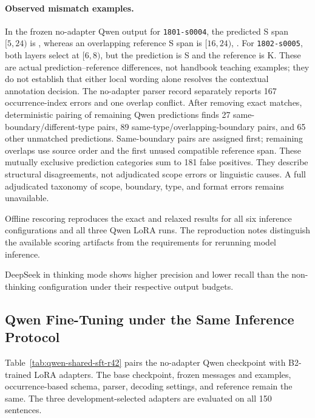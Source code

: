 \paragraph{Observed mismatch examples.}
In the frozen no-adapter Qwen output for \texttt{1801-s0004}, the predicted S span $[5,24)$ is , whereas an overlapping reference S span is $[16,24)$, . For \texttt{1802-s0005}, both layers select  at $[6,8)$, but the prediction is S and the reference is K. These are actual prediction--reference differences, not handbook teaching examples; they do not establish that either local wording alone resolves the contextual annotation decision. The no-adapter parser record separately reports 167 occurrence-index errors and one overlap conflict. After removing exact matches, deterministic pairing of remaining Qwen predictions finds 27 same-boundary/different-type pairs, 89 same-type/overlapping-boundary pairs, and 65 other unmatched predictions. Same-boundary pairs are assigned first; remaining overlaps use source order and the first unused compatible reference span. These mutually exclusive prediction categories sum to 181 false positives. They describe structural disagreements, not adjudicated scope errors or linguistic causes. A full adjudicated taxonomy of scope, boundary, type, and format errors remains unavailable.

\FloatBarrier
Offline rescoring reproduces the exact and relaxed results for all six inference configurations and all three Qwen LoRA runs. The reproduction notes distinguish the available scoring artifacts from the requirements for rerunning model inference.

DeepSeek in thinking mode shows higher precision and lower recall than the non-thinking configuration under their respective output budgets.

\subsection{Qwen Fine-Tuning under the Same Inference Protocol}
\label{sec:qwen-shared-sft-r42}
Table~\ref{tab:qwen-shared-sft-r42} pairs the no-adapter Qwen checkpoint with B2-trained LoRA adapters. The base checkpoint, frozen messages and examples, occurrence-based schema, parser, decoding settings, and reference remain the same. The three development-selected adapters are evaluated on all 150 sentences. 

